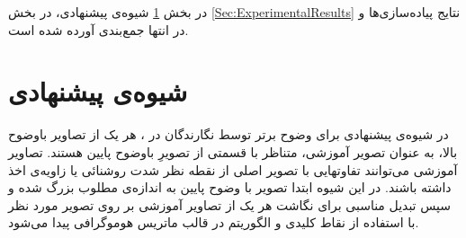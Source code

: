 \documentclass[11pt,a4paper,twocolumn]{article}
\numberwithin{table}{section}
\begin{document}
  
در بخش \ref{Sec:TheProposedMethod} شیوه‌ی پیشنهادی، در بخش \ref{Sec:ExperimentalResults} نتایج پیاده‌سازی‌ها و در انتها جمع‌بندی آورده شده است.

\section{شیوه‌ی پیشنهادی}\label{Sec:TheProposedMethod}

 در شیوه‌ی پیشنهادی برای وضوح برتر توسط نگارندگان در \cite{Amintoosi08reconstruction}، هر یک از تصاویر باوضوح بالا، به عنوان تصویر آموزشی، متناظر با قسمتی از تصویرِ باوضوح پایین هستند.  تصاویر آموزشی می‌توانند تفاوتهایی با تصویر اصلی از نقطه نظر شدت روشنائی یا زاویه‌ی اخذ داشته باشند. 
 در این شیوه ابتدا تصویر با وضوح پایین به اندازه‌ی مطلوب بزرگ شده و سپس  تبدیل مناسبی برای نگاشت هر یک از تصاویر آموزشی بر روی تصویر مورد نظر با استفاده از  نقاط کلیدی  و الگوریتم  در قالب ماتریس هوموگرافی
 پیدا می‌شود. 
 
\end{document}
